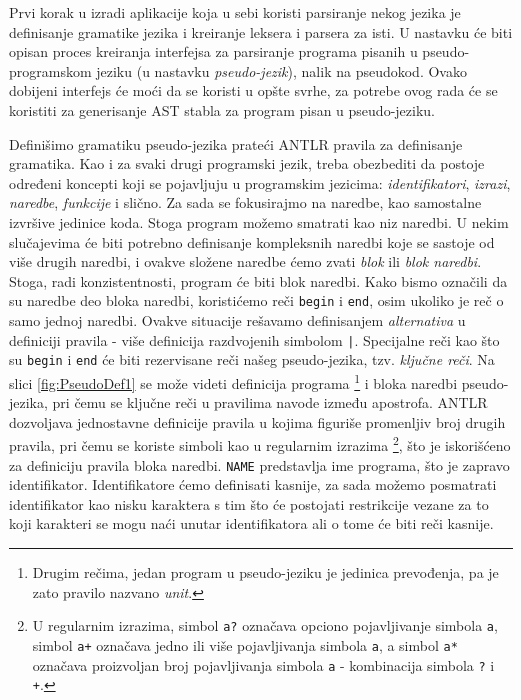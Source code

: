 Prvi korak u izradi aplikacije koja u sebi koristi parsiranje nekog jezika je definisanje gramatike jezika i kreiranje leksera i parsera za isti. U nastavku će biti opisan proces kreiranja interfejsa za parsiranje programa pisanih u pseudo-programskom jeziku (u nastavku \emph{pseudo-jezik}), nalik na pseudokod. Ovako dobijeni interfejs će moći da se koristi u opšte svrhe, za potrebe ovog rada će se koristiti za generisanje AST stabla za program pisan u pseudo-jeziku.

Definišimo gramatiku pseudo-jezika prateći ANTLR pravila za definisanje gramatika. Kao i za svaki drugi programski jezik, treba obezbediti da postoje određeni koncepti koji se pojavljuju u programskim jezicima: \emph{identifikatori}, \emph{izrazi}, \emph{naredbe}, \emph{funkcije} i slično. Za sada se fokusirajmo na naredbe, kao samostalne izvršive jedinice koda. Stoga program možemo smatrati kao niz naredbi. U nekim slučajevima će biti potrebno definisanje kompleksnih naredbi koje se sastoje od više drugih naredbi, i ovakve složene naredbe ćemo zvati \emph{blok} ili \emph{blok naredbi}. Stoga, radi konzistentnosti, program će biti blok naredbi. Kako bismo označili da su naredbe deo bloka naredbi, koristićemo reči \texttt{begin} i \texttt{end}, osim ukoliko je reč o samo jednoj naredbi. Ovakve situacije rešavamo definisanjem \emph{alternativa} u definiciji pravila - više definicija razdvojenih simbolom \texttt{|}. Specijalne reči kao što su \texttt{begin} i \texttt{end} će biti rezervisane reči našeg pseudo-jezika, tzv. \emph{ključne reči}. Na slici \ref{fig:PseudoDef1} se može videti definicija programa \footnote{Drugim rečima, jedan program u pseudo-jeziku je jedinica prevođenja, pa je zato pravilo nazvano \emph{unit}.} i bloka naredbi pseudo-jezika, pri čemu se ključne reči u pravilima navode između apostrofa. ANTLR dozvoljava jednostavne definicije pravila u kojima figuriše promenljiv broj drugih pravila, pri čemu se koriste simboli kao u regularnim izrazima \footnote{U regularnim izrazima, simbol \texttt{a?} označava opciono pojavljivanje simbola \texttt{a}, simbol \texttt{a+} označava jedno ili više pojavljivanja simbola \texttt{a}, a simbol \texttt{a*} označava proizvoljan broj pojavljivanja simbola \texttt{a} - kombinacija simbola \texttt{?} i \texttt{+}.}, što je iskorišćeno za definiciju pravila bloka naredbi. \texttt{NAME} predstavlja ime programa, što je zapravo identifikator. Identifikatore ćemo definisati kasnije, za sada možemo posmatrati identifikator kao nisku karaktera s tim što će postojati restrikcije vezane za to koji karakteri se mogu naći unutar identifikatora ali o tome će biti reči kasnije.

